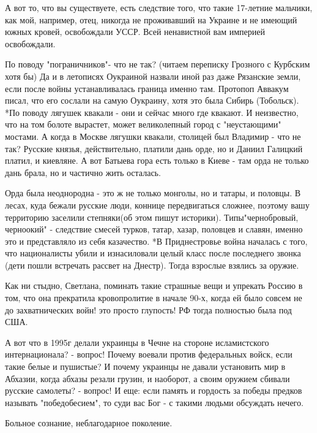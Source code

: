 \begin{itemize}
А вот то, что вы существуете, есть следствие того, что такие 17-летние
мальчики, как мой, например, отец, никогда не проживавший на Украине и не
имеющий южных кровей, освобождали УССР. Всей ненавистной вам империей
освобождали. 

По поводу "пограничников"- что не так? (читаем переписку Грозного с Курбским
хотя бы) Да и в летописях Оукраиной назвали иной раз даже Рязанские земли, если
после войны устанавливалась граница именно там. Протопоп Аввакум писал, что его
сослали на самую Оукраину, хотя это была Сибирь (Тобольск). *По поводу лягушек
квакали - они и сейчас много где квакают. И неизвестно, что на том болоте
вырастет, может великолепный город с "неустающими" мостами. А когда в Москве
лягушки квакали, столицей был Владимир - что не так? Русские князья,
действительно, платили дань орде, но и Даниил Галицкий платил, и киевляне. А
вот Батыева гора есть только в Киеве - там орда не только дань брала, но и
частично жить осталась. 

Орда была неоднородна - это ж не только монголы, но и татары, и половцы. В
лесах, куда бежали русские люди, коннице передвигаться сложнее, поэтому вашу
территорию заселили степняки(об этом пишут историки).  Типы"чернобровый,
черноокий" - следствие смесей турков, татар, хазар, половцев и славян, именно
это и представляло из себя казачество. *В Приднестровье война началась с того,
что националисты убили и изнасиловали целый класс после последнего звонка (дети
пошли встречать рассвет на Днестр). Тогда взрослые взялись за оружие. 

Как ни стыдно, Светлана, поминать такие страшные вещи и упрекать Россию в том,
что она прекратила кровопролитие в начале 90-х, когда ей было совсем не до
захватнических войн! это просто глупость! РФ тогда полностью была под США. 

А вот что в 1995г делали украинцы в Чечне на стороне исламистского
интернационала? - вопрос! Почему воевали против федеральных войск, если такие
белые и пушистые? И почему украинцы не давали установить мир в Абхазии, когда
абхазы резали грузин, и наоборот, а своим оружием сбивали русские самолеты? -
вопрос! И еще: если память и гордость за победы предков называть
"победобесием", то суди вас Бог - с такими людьми обсуждать нечего.

Больное сознание, неблагодарное поколение.

 


\end{itemize}

